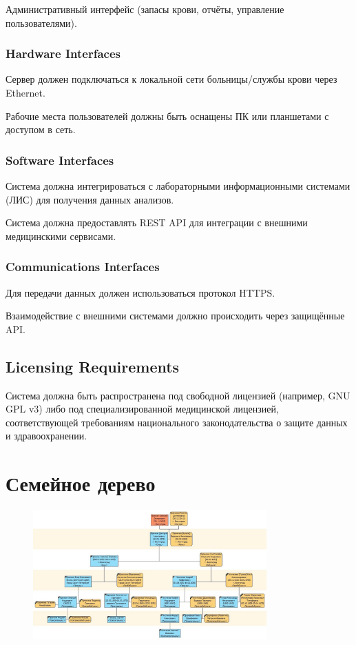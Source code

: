 \documentclass[a4paper,12pt]{article}
\begin{document}
Административный интерфейс (запасы крови, отчёты, управление пользователями).

\subsubsection*{Hardware Interfaces}

Сервер должен подключаться к локальной сети больницы/службы крови через Ethernet.

Рабочие места пользователей должны быть оснащены ПК или планшетами с доступом в сеть.

\subsubsection*{Software Interfaces}

Система должна интегрироваться с лабораторными информационными системами (ЛИС) для получения данных анализов.

Система должна предоставлять REST API для интеграции с внешними медицинскими сервисами.

\subsubsection*{Communications Interfaces}

Для передачи данных должен использоваться протокол HTTPS.

Взаимодействие с внешними системами должно происходить через защищённые API.

\subsection*{Licensing Requirements}

Система должна быть распространена под свободной лицензией (например, GNU GPL v3) либо под специализированной медицинской лицензией, соответствующей требованиям национального законодательства о защите данных и здравоохранении.




\section*{Семейное дерево}

\begin{figure}[h!]
  \includegraphics[width=0.8\textwidth]{img/family_tree.jpg}
\end{figure}
\end{document}
